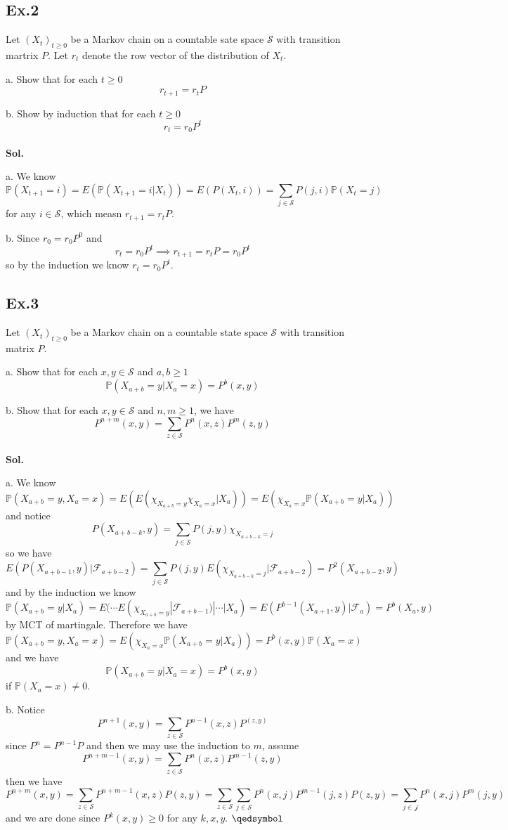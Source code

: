 \documentclass[lang=en,11pt,a4paper,citestyle =authoryear]{elegantpaper}
\newcommand{\prvd}{$\hfill \qedsymbol$}
\newcommand{\F}{\mathcal{F}}
\newcommand{\Pb}{\mathbb{P}}
\begin{document}
\subsection*{Ex.2} 
Let $(X_t)_{t\geq 0}$ be a Markov chain on a countable sate space $\mathscr{S}$ with transition martrix $P$. Let $r_t$ denote the row vector of the distribution of $X_t$.\par
a. Show that for each $t\geq 0$
\[r_{t+1} = r_tP\]\par
b. Show by induction that for each $t\geq 0$
\[r_t = r_0 P^t\]
\vspace{0.5em}\\
\textbf{Sol.}\par
a. We know
\[
\Pb(X_{t+1} = i) = E(\Pb(X_{t+1} = i|X_t)) = E(P(X_t,i)) = \sum\limits_{j\in\mathscr{S}} P(j,i)\Pb(X_{t} = j)
\]
for any $i\in\mathscr{S}$, which measn $r_{t+1} = r_t P$.\par
b. Since $r_0 = r_0 P^0$ and 
\[
r_t = r_0P^t \implies r_{t+1} = r_tP = r_0P^t
\]
so by the induction we know $r_t = r_0 P^t$.
\vspace{0.5em}

\subsection*{Ex.3}
Let $(X_t)_{t\geq 0}$ be a Markov chain on a countable state space $\mathscr{S}$ with transition matrix $P$.\par
a. Show that for each $x,y \in \mathscr{S}$ and $a,b \geq 1$
\[\Pb(X_{a+b} = y|X_a = x) = P^b(x,y)\]\par
b. Show that for each $x,y \in \mathscr{S}$ and $n,m \geq 1$, we have
\[P^{n+m}(x,y) = \sum\limits_{z\in\mathscr{S}} P^n(x,z)P^m(z,y)\]
\vspace{0.5em}\\
\textbf{Sol.} \par
a. We know
\[
\Pb(X_{a+b} = y, X_a = x) = E(E(\chi_{X_{a+b} = y}\chi_{X_a = x}|X_a)) = E(\chi_{X_a = x}\Pb(X_{a+b}=y|X_a))
\]
and notice
\[
P(X_{a+b-k},y) = \sum\limits_{j \in \mathscr{S}} P(j,y)\chi_{X_{a+b-k} = j}
\]
so we have
\[
E(P(X_{a+b-1},y)|\F_{a+b-2}) = \sum\limits_{j \in \mathscr{S}} P(j,y)E(\chi_{X_{a+b-k} = j}|\F_{a+b-2}) = P^2(X_{a+b-2},y)
\]
and by the induction we know
\[
\Pb(X_{a+b}=y|X_a) = E(\cdots E(\chi_{X_{a+b} = y}|\F_{a+b-1})|\cdots|X_a) = E(P^{b-1}(X_{a+1},y)|\F_a) = P^b(X_a, y)
\]
by MCT of martingale. Therefore we have
\[
\Pb(X_{a+b} = y, X_a = x) = E(\chi_{X_a = x}\Pb(X_{a+b}=y|X_a)) = P^b(x,y)\Pb(X_a = x)
\]
and we have
\[\Pb(X_{a+b} = y|X_a = x) = P^b(x,y)\]
if $\Pb(X_a = x) \neq 0$.\par
b. Notice
\[P^{n+1}(x,y) = \sum\limits_{z\in\mathscr{S}} P^{n-1}(x,z)P^(z,y)\] 
since $P^n = P^{n-1}P$ and then we may use the induction to $m$, assume
\[
P^{n+m-1}(x,y) = \sum\limits_{z\in\mathscr{S}} P^n(x,z)P^{m-1}(z,y)
\]
then we have
\[
P^{n+m}(x,y) = \sum\limits_{z\in\mathscr{S}} P^{n+m-1}(x,z)P(z,y) = \sum\limits_{z\in\mathscr{S}} \sum\limits_{j\in\mathscr{S}} P^n(x,j)P^{m-1}(j,z)P(z,y) = \sum\limits_{j\in\mathscr{j}} P^n(x,j)P^m(j,y)
\]
and we are done since $P^k(x,y) \geq 0$ for any $k,x,y$.
\prvd
\vspace{0.5em}
\end{document}
